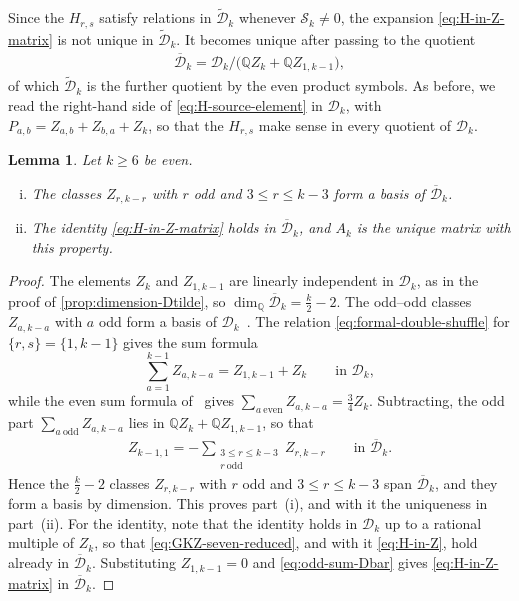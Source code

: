 \documentclass[12pt]{amsart}
\numberwithin{equation}{section}
\theoremstyle{plain}
\newtheorem{lem}[lem]{Lemma}
\newcommand{\odd}{\mathrm{odd}}
\newcommand{\even}{\mathrm{even}}
\newcommand{\QQ}{\mathbb{Q}}
\newcommand{\Dk}{\mathcal D_k}
\newcommand{\Dtk}{\widetilde{\mathcal D}_k}
\newcommand{\Dbk}{\overline{\mathcal D}_k}
\begin{document}
Since the $H_{r,s}$ satisfy relations in $\Dtk$ whenever
$\mathcal S_k\neq0$, the expansion \eqref{eq:H-in-Z-matrix} is not
unique in $\Dtk$. It becomes unique after passing to the quotient
\begin{align}\label{eq:Dbar}
 \Dbk=\Dk/\bigl(\QQ Z_k+\QQ Z_{1,k-1}\bigr),
\end{align}
of which $\Dtk$ is the further quotient by the even product symbols.
As before, we read the right-hand side of \eqref{eq:H-source-element}
in $\Dk$, with $P_{a,b}=Z_{a,b}+Z_{b,a}+Z_k$, so that the $H_{r,s}$
make sense in every quotient of $\Dk$.

\begin{lem}\label{lem:Dbar-basis}
Let $k\geq6$ be even.
\begin{enumerate}[(i)]
\item The classes $Z_{r,k-r}$ with $r$ odd and $3\leq r\leq k-3$ form
a basis of $\Dbk$.
\item The identity \eqref{eq:H-in-Z-matrix} holds in $\Dbk$, and
$A_k$ is the unique matrix with this property.
\end{enumerate}
\end{lem}

\begin{proof}
The elements $Z_k$ and $Z_{1,k-1}$ are linearly independent in $\Dk$,
as in the proof of \cref{prop:dimension-Dtilde}, so
$\dim_{\QQ}\Dbk=\frac k2-2$. The odd--odd classes $Z_{a,k-a}$ with
$a$ odd form a basis of $\Dk$~\cite[Theorem~2]{GKZ}. The relation
\eqref{eq:formal-double-shuffle} for $\{r,s\}=\{1,k-1\}$ gives the sum
formula
\[
 \sum_{a=1}^{k-1}Z_{a,k-a}=Z_{1,k-1}+Z_k
 \qquad\text{in }\Dk,
\]
while the even sum formula of~\cite[Theorem~1]{GKZ} gives
$\sum_{a\ \even}Z_{a,k-a}=\frac34Z_k$. Subtracting, the odd part
$\sum_{a\ \odd}Z_{a,k-a}$ lies in $\QQ Z_k+\QQ Z_{1,k-1}$, so that
\begin{align}\label{eq:odd-sum-Dbar}
 Z_{k-1,1}=-\sum_{\substack{3\leq r\leq k-3\\r\ \odd}}Z_{r,k-r}
 \qquad\text{in }\Dbk.
\end{align}
Hence the $\frac k2-2$ classes $Z_{r,k-r}$ with $r$ odd and
$3\leq r\leq k-3$ span $\Dbk$, and they form a basis by dimension.
This proves part~(i),
and with it the uniqueness in part~(ii). For the identity, note that
the identity \cite[(7)]{GKZ} holds in $\Dk$ up to a rational multiple
of $Z_k$, so that \eqref{eq:GKZ-seven-reduced}, and with it
\eqref{eq:H-in-Z}, hold already in $\Dbk$. Substituting
$Z_{1,k-1}=0$ and \eqref{eq:odd-sum-Dbar} gives
\eqref{eq:H-in-Z-matrix} in $\Dbk$.
\end{proof}
\end{document}
